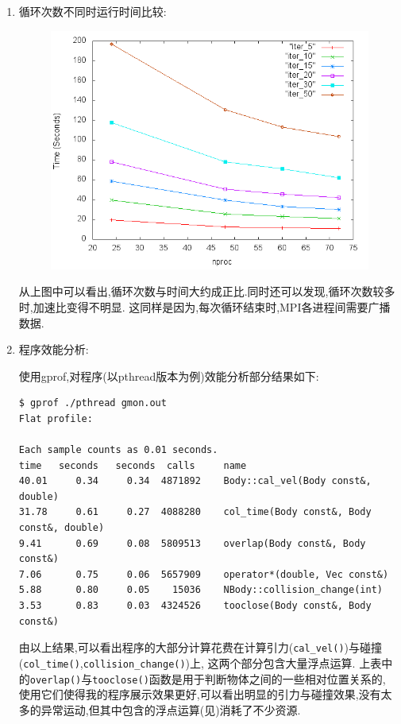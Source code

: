 \begin{enumerate}
\item 循环次数不同时运行时间比较:
	\begin{figure}[H]
		\centering
		\includegraphics[scale=0.7]{res/iter.png}
	\end{figure}

	从上图中可以看出,循环次数与时间大约成正比.同时还可以发现,循环次数较多时,加速比变得不明显.
	这同样是因为,每次循环结束时,MPI各进程间需要广播数据.

\item 程序效能分析:

	使用gprof,对程序(以pthread版本为例)效能分析部分结果如下:

\begin{lstlisting}[basicstyle=\scriptsize\ttfamily]
$ gprof ./pthread gmon.out 
Flat profile:

Each sample counts as 0.01 seconds.
time   seconds   seconds  calls     name    
40.01     0.34     0.34  4871892    Body::cal_vel(Body const&, double)
31.78     0.61     0.27  4088280    col_time(Body const&, Body const&, double)
9.41      0.69     0.08  5809513    overlap(Body const&, Body const&)
7.06      0.75     0.06  5657909    operator*(double, Vec const&)
5.88      0.80     0.05    15036    NBody::collision_change(int)
3.53      0.83     0.03  4324526    tooclose(Body const&, Body const&)
\end{lstlisting}

	由以上结果,可以看出程序的大部分计算花费在计算引力(\verb|cal_vel()|)与碰撞(\verb|col_time()|,\verb|collision_change()|)上,
	这两个部分包含大量浮点运算. 上表中的\verb|overlap()|与\verb|tooclose()|函数是用于判断物体之间的一些相对位置关系的,
	使用它们使得我的程序展示效果更好,可以看出明显的引力与碰撞效果,没有太多的异常运动,但其中包含的浮点运算(见)消耗了不少资源.
\end{enumerate}

